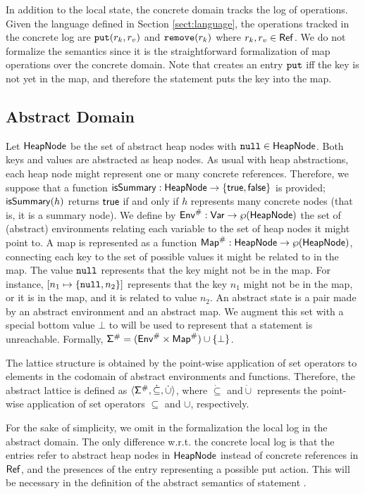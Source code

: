 In addition to the local state, the concrete domain tracks the log of operations. Given the language defined in Section \ref{sect:language}, the operations tracked in the concrete log are $\mathtt{put}(r_k, r_v)$ and $\mathtt{remove}(r_k)$ where $r_k, r_v \in \mathsf{Ref}$. We do not formalize the semantics since it is the straightforward formalization of map operations over the concrete domain. Note that  creates an entry $\mathtt{put}$ iff the key is not yet in the map, and therefore the statement puts the key into the map.

\subsection{Abstract Domain}
\label{sect:abstractate}

Let $\mathsf{HeapNode}$ be the set of abstract heap nodes with $\mathtt{null} \in \mathsf{HeapNode}$. Both keys and values are abstracted as heap nodes. As usual with heap abstractions, each heap node might represent one or many concrete references. Therefore, we suppose that a function $\mathsf{isSummary} : \mathsf{HeapNode} \to \{\mathsf{true}, \mathsf{false}\}$ is provided; $\mathsf{isSummary}(h)$ returns $\mathsf{true}$ if and only if $h$ represents many concrete nodes (that is, it is a summary node). We define by $\mathsf{Env}^\# : \mathsf{Var} \to \wp(\mathsf{HeapNode})$ the set of (abstract) environments relating each variable to the set of heap nodes it might point to. A map is represented as a function $\mathsf{Map}^\# : \mathsf{HeapNode} \to \wp(\mathsf{HeapNode})$, connecting each key to the set of possible values it might be related to in the map. The value $\mathtt{null}$ represents that the key might not be in the map. For instance, $[n_1 \mapsto \{\mathtt{null}, n_2\}]$ represents that the key $n_1$ might not be in the map, or it is in the map, and it is related to value $n_2$. An abstract state is a pair made by an abstract environment and an abstract map. We augment this set with a special bottom value $\bot$ to will be used to represent that a statement is unreachable. Formally, $\mathsf{\Sigma}^\# = (\mathsf{Env}^\# \times \mathsf{Map}^\#) \cup \{\bot\}$.

The lattice structure is obtained by the point-wise application of set operators to elements in the codomain of abstract environments and functions. Therefore, the abstract lattice is defined as $\langle \mathsf{\Sigma}^\#, \dot{\subseteq}, \dot{\cup} \rangle$, where $\dot{\subseteq}$ and$\dot{\cup}$ represents the point-wise application of set operators $\subseteq$ and $\cup$, respectively.

For the sake of simplicity, we omit in the formalization the local log in the abstract domain. The only difference w.r.t. the concrete local log is that the entries refer to abstract heap nodes in $\mathsf{HeapNode}$ instead of concrete references in $\mathsf{Ref}$, and the presences of the entry  representing a possible put action. This will be necessary in the definition of the abstract semantics of statement .

